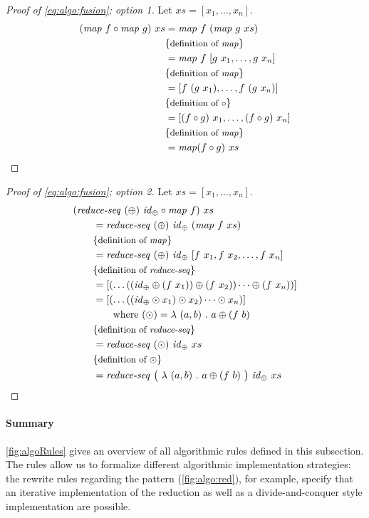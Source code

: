 \begin{proof}[Proof of \autoref{eq:algo:fusion}; option 1]
  Let $xs = [x_1, \ldots, x_n]$.
  \begin{align*}
    (\text{\textit{map}}\ f\circ \text{\textit{map}}\ g)\ xs
      &= \text{\textit{map}}\ f\ (\text{\textit{map}}\ g\ xs)\\
      &\{\text{\small definition of \text{\textit{map}}}\}\\
      &= \text{\textit{map}}\ f\ [g\ x_1, \ldots, g\ x_n]\\
      &\{\text{\small definition of \text{\textit{map}}}\}\\
      &= [f\ (g\ x_1), \ldots, f\ (g\ x_n)]\\
      &\{\text{\small definition of $\circ$}\}\\
      &= [(f\circ g)\ x_1, \ldots, (f\circ g)\ x_n]\\
      &\{\text{\small definition of \text{\textit{map}}}\}\\
      &= \text{\textit{map}} (f\circ g)\ xs
  \end{align*}
\end{proof}
\begin{proof}[Proof of \autoref{eq:algo:fusion}; option 2]
  Let $xs = [x_1, \ldots, x_n]$.
  \begin{align*}
    &(\reduceSeq\ (\oplus)\ \id_\oplus \circ \map\ f)\ xs\\
    &\qquad = \reduceSeq\ (\oplus)\ \id_\oplus\ (\map\ f\ xs)\\
    &\qquad \comment{definition of \map}\\
    &\qquad = \reduceSeq\ (\oplus)\ \id_\oplus\ [f\ x_1, f\ x_2, \ldots, f\ x_n]\\
    &\qquad \comment{definition of \reduceSeq}\\
    &\qquad = [ (\dots ((\id_\oplus \oplus (f\ x_1)) \oplus (f\ x_2)) \dots \oplus (f\ x_n)) ]\\
    &\qquad = [ (\dots ((\id_\oplus \odot x_1) \odot x_2) \dots \odot x_n) ]\\
    &\qquad\qquad \text{where } (\odot) = \lambda\ (a,b)\ .\ a \oplus (f\ b)\\
    &\qquad \comment{definition of \reduceSeq}\\
    &\qquad = \reduceSeq\ (\odot)\ \id_\oplus\ xs\\
    &\qquad \comment{definition of $\odot$}\\
    &\qquad = \reduceSeq\ \big(\ \lambda\ (a,b)\ .\ a \oplus (f\ b)\ \big)\ \id_\oplus\ xs
  \end{align*}
\end{proof}

\paragraph{Summary}
\autoref{fig:algoRules} gives an overview of all algorithmic rules defined in this subsection.
The rules allow us to formalize different algorithmic implementation strategies:
the rewrite rules regarding the \reduce pattern (\autoref{fig:algo:red}), for example, specify that an iterative implementation of the reduction as well as a divide-and-conquer style implementation are possible.

